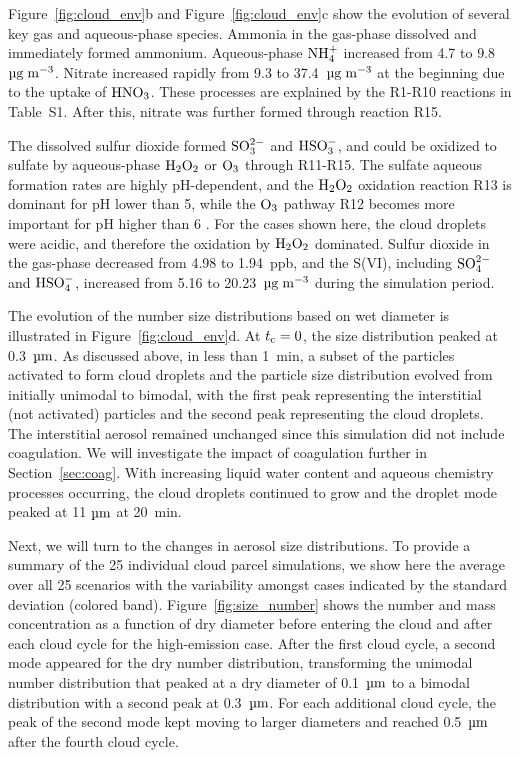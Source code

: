 \documentclass[edeposit,fullpage]{uiucthesis2009}
\begin{document}
Figure~\ref{fig:cloud_env}b and Figure~\ref{fig:cloud_env}c show the
evolution of several key gas and aqueous-phase species. Ammonia in the
gas-phase dissolved and immediately formed ammonium. Aqueous-phase
$\rm NH_4^+$ increased from 4.7 to 9.8~$\rm \mu g\;m^{-3}$. Nitrate
increased rapidly from 9.3 to 37.4~$\rm \mu g\;m^{-3}$ at the
beginning due to the uptake of $\rm HNO_3$. These processes are
explained by the R1-R10 reactions in Table~S1. After
this, nitrate was further formed through reaction R15.

The dissolved sulfur dioxide formed $\rm SO_3^{2-}$ and $\rm HSO_3^-$,
and could be oxidized to sulfate by aqueous-phase $\rm H_2O_2$ or $\rm
O_3$ through R11-R15. The sulfate aqueous formation rates are highly
pH-dependent, and the $\rm H_2O_2$ oxidation reaction R13 is dominant
for pH lower than 5, while the $\rm O_3$ pathway R12 becomes more
important for pH higher than 6 \citep{Seinfeld2016, Shao2019}. For the
cases shown here, the cloud droplets were acidic, and therefore the
oxidation by $\rm H_2O_2$ dominated. Sulfur dioxide in the gas-phase
decreased from 4.98 to 1.94~ppb, and the S(VI), including $\rm
SO_4^{2-}$ and $\rm HSO_4^-$, increased from 5.16 to 20.23~$\rm \mu
g\;m^{-3}$ during the simulation period.

The evolution of the number size distributions based on wet diameter
is illustrated in Figure~\ref{fig:cloud_env}d. At $t_{\rm c} =
0$, the size distribution peaked at 0.3~$\rm \mu m$.  As discussed
above, in less than 1~min, a subset of the particles activated to form
cloud droplets and the particle size distribution evolved from
initially unimodal to bimodal, with the first peak representing the
interstitial (not activated) particles and the second peak
representing the cloud droplets. The interstitial aerosol remained
unchanged since this simulation did not include coagulation. We will
investigate the impact of coagulation further in
Section~\ref{sec:coag}. With increasing liquid water content and
aqueous chemistry processes occurring, the cloud droplets continued to
grow and the droplet mode peaked at 11 $\rm \mu m$ at 20~min.

Next, we will turn to the changes in aerosol size distributions. To
provide a summary of the 25 individual cloud parcel simulations, we
show here the average over all 25 scenarios with the variability
amongst cases indicated by the standard deviation (colored band).
Figure~\ref{fig:size_number} shows the number and mass concentration
as a function of dry diameter before entering the cloud and after each
cloud cycle for the high-emission case. After the first cloud
cycle, a second mode appeared for the dry number distribution,
transforming the unimodal number distribution that peaked at a dry
diameter of 0.1~$\rm \mu m$ to a bimodal distribution with a second
peak at 0.3~$\rm \mu m$.  For each additional cloud cycle, the peak of
the second mode kept moving to larger diameters and reached 0.5~$\rm
\mu m$ after the fourth cloud cycle.
\end{document}
